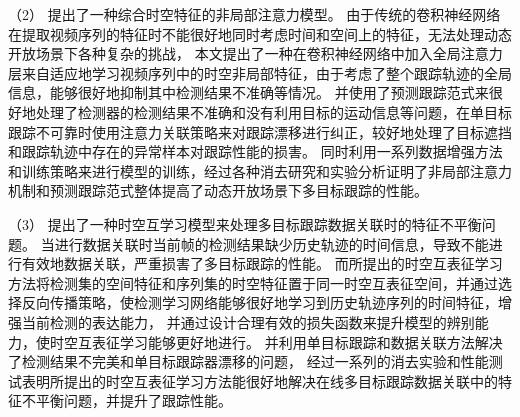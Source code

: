 （2）
提出了一种综合时空特征的非局部注意力模型。
由于传统的卷积神经网络在提取视频序列的特征时不能很好地同时考虑时间和空间上的特征，无法处理动态开放场景下各种复杂的挑战，
本文提出了一种在卷积神经网络中加入全局注意力层来自适应地学习视频序列中的时空非局部特征，由于考虑了整个跟踪轨迹的全局信息，能够很好地抑制其中检测结果不准确等情况。
并使用了预测跟踪范式来很好地处理了检测器的检测结果不准确和没有利用目标的运动信息等问题，在单目标跟踪不可靠时使用注意力关联策略来对跟踪漂移进行纠正，较好地处理了目标遮挡和跟踪轨迹中存在的异常样本对跟踪性能的损害。
同时利用一系列数据增强方法和训练策略来进行模型的训练，经过各种消去研究和实验分析证明了非局部注意力机制和预测跟踪范式整体提高了动态开放场景下多目标跟踪的性能。

（3）  
提出了一种时空互学习模型来处理多目标跟踪数据关联时的特征不平衡问题。
当进行数据关联时当前帧的检测结果缺少历史轨迹的时间信息，导致不能进行有效地数据关联，严重损害了多目标跟踪的性能。
而所提出的时空互表征学习方法将检测集的空间特征和序列集的时空特征置于同一时空互表征空间，并通过选择反向传播策略，使检测学习网络能够很好地学习到历史轨迹序列的时间特征，增强当前检测的表达能力，
并通过设计合理有效的损失函数来提升模型的辨别能力，使时空互表征学习能够更好地进行。
并利用单目标跟踪和数据关联方法解决了检测结果不完美和单目标跟踪器漂移的问题，
经过一系列的消去实验和性能测试表明所提出的时空互表征学习方法能很好地解决在线多目标跟踪数据关联中的特征不平衡问题，并提升了跟踪性能。

